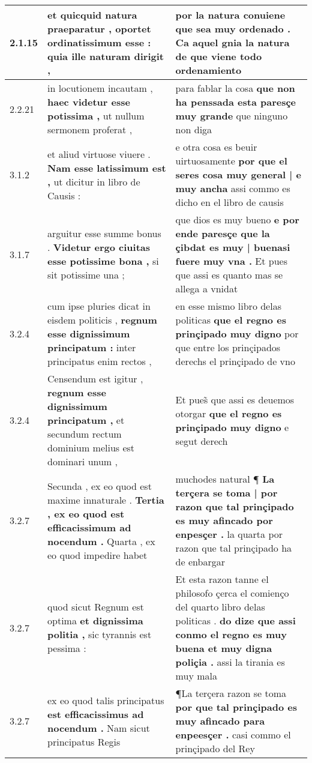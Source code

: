 \begin{tabular}{|p{1cm}|p{6.5cm}|p{6.5cm}|}
2.1.15 & et quicquid natura praeparatur , \textbf{ oportet ordinatissimum esse : } quia ille naturam dirigit , & por la natura \textbf{ conuiene que sea muy ordenado . } Ca aquel gnia la natura de que viene todo ordenamiento \\\hline
2.2.21 & in locutionem incautam , \textbf{ haec videtur esse potissima , } ut nullum sermonem proferat , & para fablar la cosa \textbf{ que non ha penssada esta paresçe muy grande } que ninguno non diga \\\hline
3.1.2 & et aliud virtuose viuere . \textbf{ Nam esse latissimum est , } ut dicitur in libro de Causis : & e otra cosa es beuir uirtuosamente \textbf{ por que el seres cosa muy general | e muy ancha } assi commo es dicho en el libro de causis \\\hline
3.1.7 & arguitur esse summe bonus . \textbf{ Videtur ergo ciuitas esse potissime bona , } si sit potissime una ; & que dios es muy bueno \textbf{ e por ende paresçe que la çibdat es muy | buenasi fuere muy vna . } Et pues que assi es quanto mas se allega a vnidat \\\hline
3.2.4 & cum ipse pluries dicat in eisdem politicis , \textbf{ regnum esse dignissimum principatum : } inter principatus enim rectos , & en esse mismo libro delas politicas \textbf{ que el regno es prinçipado muy digno } por que entre los prinçipados derechs el prinçipado de vno \\\hline
3.2.4 & Censendum est igitur , \textbf{ regnum esse dignissimum principatum , } et secundum rectum dominium melius est dominari unum , & Et pues̃ que assi es deuemos otorgar \textbf{ que el regno es prinçipado muy digno } e segut derech \\\hline
3.2.7 & Secunda , ex eo quod est maxime innaturale . \textbf{ Tertia , ex eo quod est efficacissimum ad nocendum . } Quarta , ex eo quod impedire habet & muchodes natural ¶ \textbf{ La terçera se toma | por razon que tal prinçipado es muy afincado por enpesçer . } la quarta por razon que tal prinçipado ha de enbargar \\\hline
3.2.7 & quod sicut Regnum est optima \textbf{ et dignissima politia , } sic tyrannis est pessima : & Et esta razon tanne el philosofo çerca el comienço del quarto libro delas politicas . \textbf{ do dize que assi conmo el regno es muy buena et muy digna poliçia . } assi la tirania es muy mala \\\hline
3.2.7 & ex eo quod talis principatus \textbf{ est efficacissimus ad nocendum . } Nam sicut principatus Regis & ¶La terçera razon se toma \textbf{ por que tal prinçipado es muy afincado para enpeesçer . } casi commo el prinçipado del Rey \\\hline

\end{tabular}
